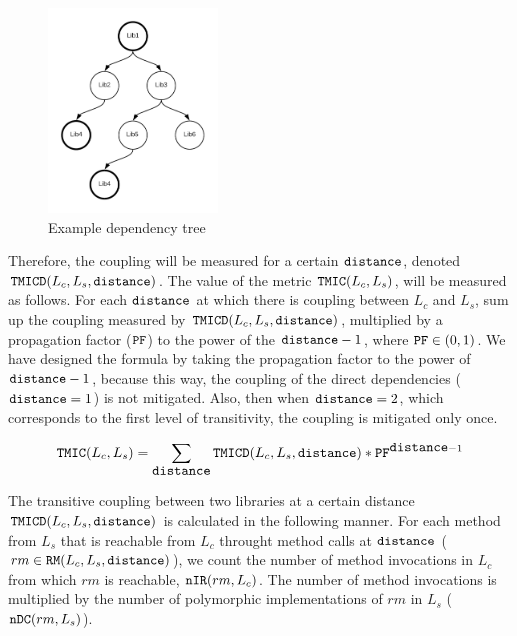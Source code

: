 \begin{figure}[ht]
\begin{center}
\includegraphics[width=0.4\textwidth]{figures/Thesis-DependencyTree.png}
\caption{Example dependency tree}
\label{fig:dependency-tree}
\end{center}
\end{figure}

Therefore, the coupling will be measured for a certain $\verb|distance|$, denoted $\verb|TMICD|(L_c,L_s, \verb|distance|)$.
The value of the metric $\verb|TMIC|(L_c,L_s)$, will be measured as follows. For each $\verb|distance|$ at which there is coupling between $L_c$ and $L_s$, sum up the coupling measured by $\verb|TMICD|(L_c,L_s, \verb|distance|)$, multiplied by a propagation factor ($\verb|PF|$) to the power of the $\verb|distance| - 1$, where $\verb|PF| \in (0,1)$. We have designed the formula by taking the propagation factor to the power of $\verb|distance| - 1$, because this way, the coupling of the direct dependencies ($\verb|distance| = 1$) is not mitigated. Also, then when $\verb|distance| = 2$, which corresponds to the first level of transitivity, the coupling is mitigated only once.

\begin{equation}
\label{eqn:tmic}
  \verb|TMIC|(L_c,L_s) = \sum_{\verb|distance|} \verb|TMICD|(L_c,L_s, \verb|distance|) * \verb|PF|^{\verb|distance| - 1}
\end{equation}

The transitive coupling between two libraries at a certain distance $\verb|TMICD|(L_c, L_s, \verb|distance|)$ is calculated in the following manner. For each method from $L_s$ that is reachable from $L_c$ throught method calls at $\verb|distance|$ ($rm \in \verb|RM|(L_c,L_s,\verb|distance|)$), we count the number of method invocations in $L_c$ from which $rm$ is reachable, $\verb|nIR|(rm, L_c)$. The number of method invocations is multiplied by the number of polymorphic implementations of $rm$ in $L_s$ ($\verb|nDC|(rm, L_s)$).

